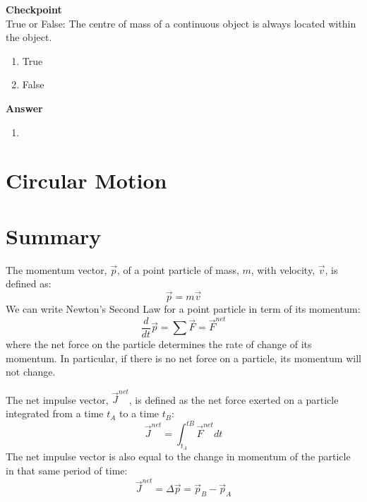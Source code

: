 \documentclass[9pt,arxiv,red]{lapreprint}
\begin{document}
\begin{framed}
\textbf{Checkpoint}\\
True or False: The centre of mass of a continuous object is always located within the object.

\begin{enumerate}
\item True
\item False
\end{enumerate}

\begin{framed}
\textbf{Answer}\\
\begin{enumerate}[resume]
\item
\end{enumerate}
\end{framed}
\end{framed}

\section{Circular Motion}\label{sec:momentumandcm:circularmotion}

\section{Summary}

The momentum vector, $\vec p$, of a point particle of mass, $m$, with velocity, $\vec v$, is defined as:
\begin{equation}
\vec p = m\vec v
\end{equation}
We can write Newton's Second Law for a point particle in term of its momentum:
\begin{equation}
\frac{d}{dt}\vec p = \sum \vec F = \vec F^{net}
\end{equation}
where the net force on the particle determines the rate of change of its momentum. In particular, if there is no net force on a particle, its momentum will not change.

The net impulse vector, $\vec J^{net}$, is defined as the net force exerted on a particle integrated from a time $t_A$ to a time $t_B$:
\begin{equation}
\vec J^{net} = \int_{t_A}^{tB} \vec F^{net} dt
\end{equation}
The net impulse vector is also equal to the change in momentum of the particle in that same period of time:
\begin{equation}
\vec J^{net} = \Delta \vec p = \vec p_B - \vec p_A
\end{equation}
\end{document}
